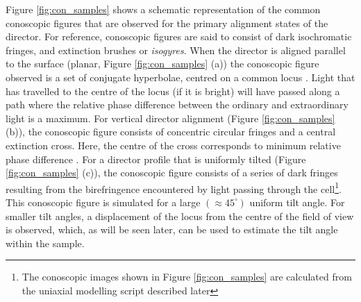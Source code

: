 Figure \ref{fig:con_samples} shows a schematic representation of the common conoscopic figures that are observed for the primary alignment states of the director. For reference, conoscopic figures are said to consist of dark isochromatic fringes, and extinction brushes or \textit{isogyres}. When the director is aligned parallel to the surface (planar, Figure \ref{fig:con_samples} (a)) the conoscopic figure observed is a set of conjugate hyperbolae, centred on a common locus \cite{Horn2001}. Light that has travelled to the centre of the locus (if it is bright) will have passed along a path where the relative phase difference between the ordinary and extraordinary light is a maximum. For vertical director alignment (Figure \ref{fig:con_samples} (b)), the conoscopic figure consists of concentric circular fringes and a central extinction cross. Here, the centre of the cross corresponds to minimum relative phase difference \cite{Horn2001}. For a director profile that is uniformly tilted (Figure \ref{fig:con_samples} (c)), the conoscopic figure consists of a series of dark fringes resulting from the birefringence encountered by light passing through the cell\footnote{The conoscopic images shown in Figure \ref{fig:con_samples} are calculated from the uniaxial modelling script described later}. This conoscopic figure is simulated for a large $\left(\approx45^{\circ}\right)$ uniform tilt angle. For smaller tilt angles, a displacement of the locus from the centre of the field of view is observed, which, as will be seen later, can be used to estimate the tilt angle within the sample.

